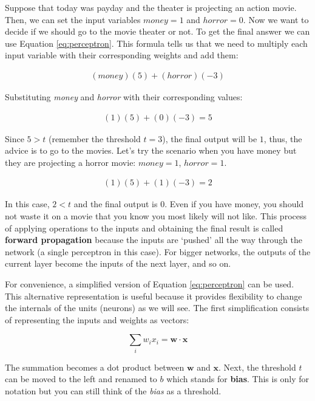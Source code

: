 \documentclass[
  11pt,
]{krantz}
\begin{document}
Suppose that today was payday and the theater is projecting an action movie. Then, we can set the input variables \(money=1\) and \(horror=0\). Now we want to decide if we should go to the movie theater or not. To get the final answer we can use Equation \eqref{eq:perceptron}. This formula tells us that we need to multiply each input variable with their corresponding weights and add them:

\begin{align*}
(money)(5) + (horror)(-3)
\end{align*}

Substituting \emph{money} and \emph{horror} with their corresponding values:

\begin{align*}
(1)(5) + (0)(-3) = 5
\end{align*}

Since \(5 > t\) (remember the threshold \(t=3\)), the final output will be \(1\), thus, the advice is to go to the movies. Let's try the scenario when you have money but they are projecting a horror movie: \(money=1\), \(horror=1\).

\begin{align*}
(1)(5) + (1)(-3) = 2
\end{align*}

In this case, \(2 < t\) and the final output is \(0\). Even if you have money, you should not waste it on a movie that you know you most likely will not like. This process of applying operations to the inputs and obtaining the final result is called \textbf{forward propagation} because the inputs are `pushed' all the way through the network (a single perceptron in this case). For bigger networks, the outputs of the current layer become the inputs of the next layer, and so on.

For convenience, a simplified version of Equation \eqref{eq:perceptron} can be used. This alternative representation is useful because it provides flexibility to change the internals of the units (neurons) as we will see. The first simplification consists of representing the inputs and weights as vectors:

\begin{equation}
  \sum_{i}{w_i x_i} = \boldsymbol{w} \cdot \boldsymbol{x}
\end{equation}

The summation becomes a dot product between \(\boldsymbol{w}\) and \(\boldsymbol{x}\). Next, the threshold \(t\) can be moved to the left and renamed to \(b\) which stands for \textbf{bias}. This is only for notation but you can still think of the \emph{bias} as a threshold.
\end{document}
